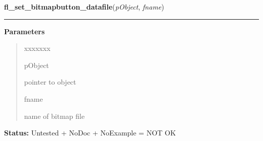     \label{xformslib:library:fl_set_bitmap_file}

    \vspace{0.5ex}

\hspace{.8\funcindent}\begin{boxedminipage}{\funcwidth}

    \raggedright \textbf{fl\_set\_bitmapbutton\_datafile}(\textit{pObject}, \textit{fname})

    \vspace{-1.5ex}

    \rule{\textwidth}{0.5\fboxrule}
\setlength{\parskip}{2ex}
\setlength{\parskip}{1ex}
      \textbf{Parameters}
      \vspace{-1ex}

      \begin{quote}
        \begin{Ventry}{xxxxxxx}

          \item[pObject]

          pointer to object

          \item[fname]

          name of bitmap file

        \end{Ventry}

      \end{quote}

\textbf{Status:} Untested + NoDoc + NoExample = NOT OK



    \end{boxedminipage}

    \label{xformslib:library:fl_add_pixmapbutton}

    \vspace{0.5ex}

